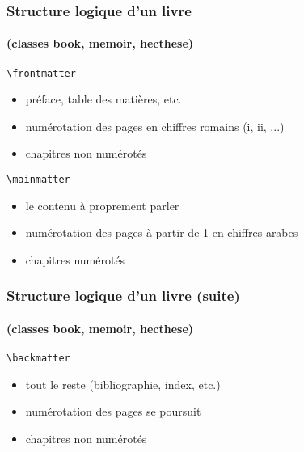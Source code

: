 
\begin{frame}[fragile]

	\frametitle{Structure logique d'un livre}
	\framesubtitle{(classes book, memoir, hecthese)}
	
	\lstinline|\frontmatter|	
	
	\begin{itemize}
		\item préface, table des matières, etc.
		\item numérotation des pages en chiffres romains (i, ii, ...)
		\item chapitres non numérotés
	\end{itemize}
	
	\lstinline|\mainmatter|	
	
	\begin{itemize}
		\item le contenu à proprement parler
		\item numérotation des pages à partir de 1 en chiffres arabes
		\item chapitres numérotés
	\end{itemize}

\end{frame}


\begin{frame}[c,fragile]

	\frametitle{Structure logique d'un livre (suite)}
	\framesubtitle{(classes book, memoir, hecthese)}
	
	\lstinline|\backmatter|
	
	\begin{itemize}
		\item tout le reste (bibliographie, index, etc.)
		\item numérotation des pages se poursuit
		\item chapitres non numérotés
	\end{itemize}
\end{frame}


